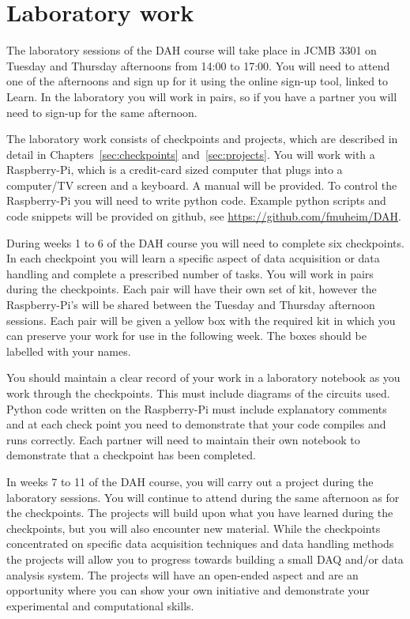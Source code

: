 \section{Laboratory work}

The laboratory sessions of the DAH course will take place in JCMB 3301 on Tuesday and Thursday afternoons from 14:00 to 17:00. You will need to attend one of the afternoons and sign up for it using the online sign-up tool, linked to Learn. In the laboratory you will work in pairs, so if you have a partner you will need to sign-up for the same afternoon.

The laboratory work consists of checkpoints and projects, which are described in detail in Chapters~\ref{sec:checkpoints} and~\ref{sec:projects}.  You will work with a Raspberry-Pi, which is a credit-card sized computer that plugs into a computer/TV screen and a keyboard. A manual will be provided. To control the Raspberry-Pi you will need to write python code. Example python scripts and code snippets will be provided on github, see \url{https://github.com/fmuheim/DAH}. 

During weeks 1 to 6 of the DAH course you will need to complete six checkpoints. In each checkpoint you will learn a specific aspect of data acquisition or data handling and complete a prescribed number of tasks. You will work in pairs during the checkpoints.
Each pair will have their own set of kit, however the Raspberry-Pi's will be shared between the Tuesday and Thursday afternoon sessions. Each pair will be given a yellow box with the required kit in which you can preserve your work for use in the following week. The boxes should be labelled with your names.

You should maintain a clear record of your work in a laboratory notebook as you work through the checkpoints. This must include diagrams of the circuits used. Python code written on the Raspberry-Pi must include explanatory comments and at each check point you need to demonstrate that your code compiles and runs correctly.  Each partner will need to maintain their own notebook to demonstrate that a checkpoint has been completed. 



In weeks 7 to 11 of the DAH course, you will carry out a project during the laboratory sessions. You will continue to attend during the same afternoon as for the checkpoints.
The projects will build upon what you have learned during the checkpoints, but you will also encounter new material. While the checkpoints concentrated on specific data acquisition techniques and data handling methods the projects will allow you to progress towards building a small DAQ and/or data analysis system. The projects will have an open-ended aspect and are an opportunity where you can show your own initiative and demonstrate your experimental and computational skills. 

